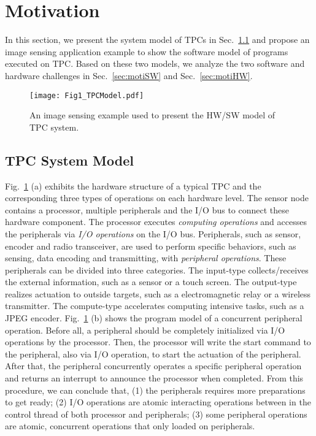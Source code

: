 \section{Motivation} \label{sec:motivation}
%
In this section, we present the system model of TPCs in Sec.~\ref{sec:motiModel} and propose an image sensing application example to show the software model of programs executed on TPC.
Based on these two models, we analyze the two software and hardware challenges in Sec.~\ref{sec:motiSW} and Sec.~\ref{sec:motiHW}. 

%
\begin{figure}[t]
    \centering
    \texttt{[image: Fig1\_TPCModel.pdf]}
    \caption{An image sensing example used to present the HW/SW model of TPC system.}
    \label{fig:TPCmodel}
\end{figure}

\subsection{TPC System Model} \label{sec:motiModel}
%
Fig.~\ref{fig:TPCmodel} (a) exhibits the hardware structure of a typical TPC and the corresponding three types of operations on each hardware level. 
The sensor node contains a processor, multiple peripherals and the I/O bus to connect these hardware component.
The processor executes \emph{computing operations} and accesses the peripherals via \emph{I/O operations} on the I/O bus.
Peripherals, such as sensor, encoder and radio transceiver, are used to perform specific behaviors, such as sensing, data encoding and transmitting, with \emph{peripheral operations}.
These peripherals can be divided into three categories.
The input-type collects/receives the external information, such as a sensor or a touch screen.
The output-type realizes actuation to outside targets, such as a electromagnetic relay or a wireless transmitter.
The compute-type accelerates computing intensive tasks, such as a JPEG encoder.
Fig.~\ref{fig:TPCmodel} (b) shows the program model of a concurrent peripheral operation.
Before all, a peripheral should be completely initialized via I/O operations by the processor.
Then, the processor will write the start command to the peripheral, also via I/O operation, to start the actuation of the peripheral.
After that, the peripheral concurrently operates a specific peripheral operation and returns an interrupt to announce the processor when completed.
From this procedure, we can conclude that, (1) the peripherals requires more preparations to get ready; (2) I/O operations are atomic interacting operations between in the control thread of both processor and peripherals; (3) some peripheral operations are atomic, concurrent operations that only loaded on peripherals.

